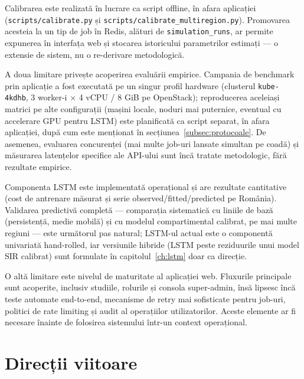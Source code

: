 Calibrarea este realizată în lucrare ca script offline, în afara aplicației
(\texttt{scripts/calibrate.py} și \texttt{scripts/calibrate\_multiregion.py}).
Promovarea acesteia la un tip de job în Redis, alături de
\texttt{simulation\_runs}, ar permite expunerea în interfața web și stocarea
istoricului parametrilor estimați --- o extensie de sistem, nu o re-derivare
metodologică.

A doua limitare privește acoperirea evaluării empirice. Campania de benchmark
prin aplicație a fost executată pe un singur profil hardware (clusterul
\texttt{kube-4kdhb}, 3 worker-i $\times$ 4 vCPU / 8 GiB pe OpenStack);
reproducerea aceleiași matrici pe alte configurații (mașini locale, noduri
mai puternice, eventual cu accelerare GPU pentru LSTM) este planificată ca
script separat, în afara aplicației, după cum este menționat în
secțiunea~\ref{subsec:protocoale}. De asemenea, evaluarea concurenței (mai
multe job-uri lansate simultan pe coadă) și măsurarea latențelor specifice
ale API-ului sunt încă tratate metodologic, fără rezultate empirice.

Componenta LSTM este implementată operațional și are rezultate cantitative
(cost de antrenare măsurat și serie observed/fitted/predicted pe România).
Validarea predictivă completă --- comparația sistematică cu liniile de bază
(persistență, medie mobilă) și cu modelul compartimental calibrat, pe mai
multe regiuni --- este următorul pas natural; LSTM-ul actual este o
componentă univariată hand-rolled, iar versiunile hibride (LSTM peste
reziduurile unui model SIR calibrat) sunt formulate în
capitolul~\ref{ch:lstm} doar ca direcție.

O altă limitare este nivelul de maturitate al aplicației web. Fluxurile
principale sunt acoperite, inclusiv studiile, rolurile și consola
super-admin, însă lipsesc încă teste automate end-to-end, mecanisme de retry
mai sofisticate pentru job-uri, politici de rate limiting și audit al
operațiilor utilizatorilor. Aceste elemente ar fi necesare înainte de
folosirea sistemului într-un context operațional.

{}
\section*{Direcții viitoare}
\label{sec:directii_viitoare}

